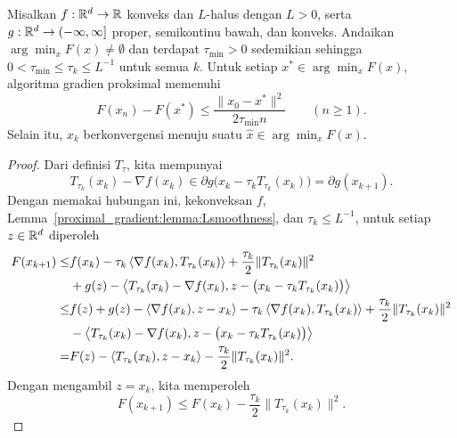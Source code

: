 \begin{theorem}
    Misalkan \(f:\mathbb{R}^d\rightarrow\mathbb{R}\) konveks dan \(L\)-halus dengan \(L>0\), serta \(g:\mathbb{R}^d\rightarrow(-\infty,\infty]\) proper, semikontinu bawah, dan konveks. Andaikan \(\arg\min_xF(x)\neq\emptyset\) dan terdapat \(\tau_{\min}>0\) sedemikian sehingga
    \(0<\tau_{\min}\leq\tau_k\leq L^{-1}\) untuk semua \(k\). Untuk setiap \(x^*\in\arg\min_xF(x)\), algoritma gradien proksimal memenuhi
    \begin{equation}
        F(x_n)-F(x^*)\leq\frac{\|x_0-x^*\|^2}{2\tau_{\min}n}
        \qquad(n\geq1).
    \end{equation}
    Selain itu, \(x_k\) berkonvergensi menuju suatu \(\hat x\in\arg\min_xF(x)\).
\end{theorem}
\begin{proof}
    Dari definisi \(T_\tau\), kita mempunyai
    \begin{equation}
        T_{\tau_k}(x_k)-\nabla f(x_k)
        \in\partial g\bigl(x_k-\tau_kT_{\tau_k}(x_k)\bigr)
        =\partial g(x_{k+1}).
    \end{equation}
    Dengan memakai hubungan ini, kekonveksan \(f\), Lemma~\ref{proximal_gradient:lemma:Lsmoothness}, dan \(\tau_k\leq L^{-1}\), untuk setiap \(z\in\mathbb{R}^d\) diperoleh
    \begin{equation}
        \begin{aligned}
            F(x_{k+1})
            \leq& f(x_k)-\tau_k\left\langle\nabla f(x_k) , T_{\tau_k}(x_k)\right\rangle
              +\frac{\tau_k}{2}\|T_{\tau_k}(x_k)\|^2\\
             &+g(z)-\left\langle T_{\tau_k}(x_k)-\nabla f(x_k) , z-\bigl(x_k-\tau_kT_{\tau_k}(x_k)\bigr)\right\rangle\\
            \leq& f(z)+g(z)-\left\langle\nabla f(x_k) , z-x_k\right\rangle
              -\tau_k\left\langle\nabla f(x_k) , T_{\tau_k}(x_k)\right\rangle
              +\frac{\tau_k}{2}\|T_{\tau_k}(x_k)\|^2\\
             &-\left\langle T_{\tau_k}(x_k)-\nabla f(x_k) , z-\bigl(x_k-\tau_kT_{\tau_k}(x_k)\bigr)\right\rangle\\
            =&F(z)-\left\langle T_{\tau_k}(x_k) , z-x_k\right\rangle
              -\frac{\tau_k}{2}\|T_{\tau_k}(x_k)\|^2.
        \end{aligned}
    \end{equation}
    Dengan mengambil \(z=x_k\), kita memperoleh
    \begin{equation}
        F(x_{k+1})\leq F(x_k)
        -\frac{\tau_k}{2}\|T_{\tau_k}(x_k)\|^2.

\end{equation}
\end{proof}
